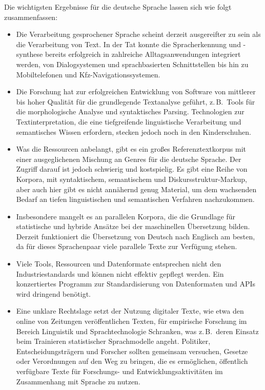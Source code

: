 \documentclass[]{../../metanetpaper}
\begin{document}
\begin{multicols}{2}
Die wichtigsten Ergebnisse für die deutsche Sprache lassen sich wie folgt zusammenfassen:

\begin{itemize}
\item Die Verarbeitung gesprochener Sprache scheint derzeit ausgereifter zu sein als die Verarbeitung von Text. In der Tat konnte die Spracherkennung und -synthese bereits erfolgreich in zahlreiche Alltagsanwendungen integriert werden, von Dialogsystemen und sprachbasierten Schnittstellen bis hin zu Mobiltelefonen und Kfz-Navigationssystemen.
\item Die Forschung hat zur erfolgreichen Entwicklung von Software von mittlerer bis hoher Qualität für die grundlegende Textanalyse geführt, z.\,B.~Tools für die morphologische Analyse und syntaktisches Parsing. Technologien zur Textinterpretation, die eine tiefgreifende linguistische Verarbeitung und semantisches Wissen erfordern, stecken jedoch noch in den Kinderschuhen.
\item Was die Ressourcen anbelangt, gibt es ein großes Referenztextkorpus mit einer ausgeglichenen Mischung an Genres für die deutsche Sprache. Der Zugriff darauf ist jedoch schwierig und kostspielig. Es gibt eine Reihe von Korpora, mit syntaktischem, semantischem und Diskursstruktur-Markup, aber auch hier gibt es nicht annähernd genug Material, um dem wachsenden Bedarf an tiefen linguistischen und semantischen Verfahren nachzukommen.
\item Insbesondere mangelt es an parallelen Korpora, die die Grundlage für statistische und hybride Ansätze bei der maschinellen Übersetzung bilden. Derzeit funktioniert die Übersetzung von Deutsch nach Englisch am besten, da für dieses Sprachenpaar viele parallele Texte zur Verfügung stehen.
\item Viele Tools, Ressourcen und Datenformate entsprechen nicht den Industriestandards und können nicht effektiv gepflegt werden. Ein konzertiertes Programm zur Standardisierung von Datenformaten und APIs wird dringend benötigt.
\item Eine unklare Rechtslage setzt der Nutzung digitaler Texte, wie etwa den online von Zeitungen veröffentlichen Texten, für empirische Forschung im Bereich Linguistik und Sprachtechnologie Schranken, was z.\,B.~deren Einsatz beim Trainieren statistischer Sprachmodelle angeht. Politiker, Entscheidungsträgern und Forscher sollten gemeinsam versuchen, Gesetze oder Verordnungen auf den Weg zu bringen, die es ermöglichen, öffentlich verfügbare Texte für Forschungs- und Entwicklungsaktivitäten im Zusammenhang mit Sprache zu nutzen.

\end{itemize}
\end{multicols}
\end{document}
